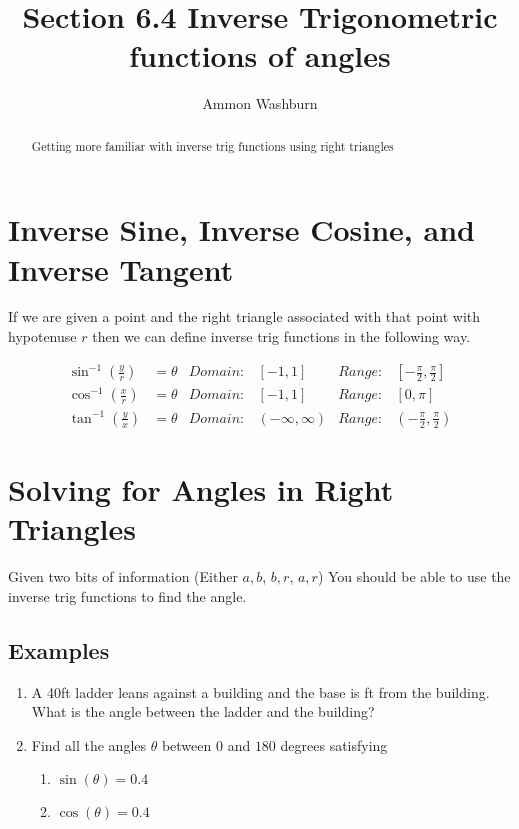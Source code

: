 \documentclass{tufte-handout}
\title{Section 6.4 Inverse Trigonometric functions of angles}
\author[AW]{Ammon Washburn}
\begin{document}
\maketitle

\begin{abstract}
Getting more familiar with inverse trig functions using right triangles
\end{abstract}

\section{Inverse Sine, Inverse Cosine, and Inverse Tangent}

If we are given a point and the right triangle associated with that point with hypotenuse $r$ then we can define inverse trig functions in the following way.

\begin{align*}
\sin^{-1}(\frac{y}{r}) &= \theta & Domain:& [-1,1] & Range:&[-\frac{\pi}{2},\frac{\pi}{2}] \\
\cos^{-1}(\frac{x}{r}) &= \theta & Domain:&[-1,1] & Range:&[0,\pi] \\
\tan^{-1}(\frac{y}{x}) &= \theta & Domain:&(-\infty,\infty) & Range:&(-\frac{\pi}{2},\frac{\pi}{2})
\end{align*}

\section{Solving for Angles in Right Triangles}

Given two bits of information (Either $a,b$, $b,r$, $a,r$) You should be able to use the inverse trig functions to find the angle.

\subsection{Examples}
\begin{enumerate}
\item A 40ft ladder leans against a building and the base is ft from the building.  What is the angle between the ladder and the building?
\item Find all the angles $\theta$ between $0$ and $180$ degrees satisfying
\begin{enumerate}
\item $\sin(\theta) = 0.4$
\item $\cos(\theta) = 0.4$
\end{enumerate}
\end{enumerate}
\end{document}
